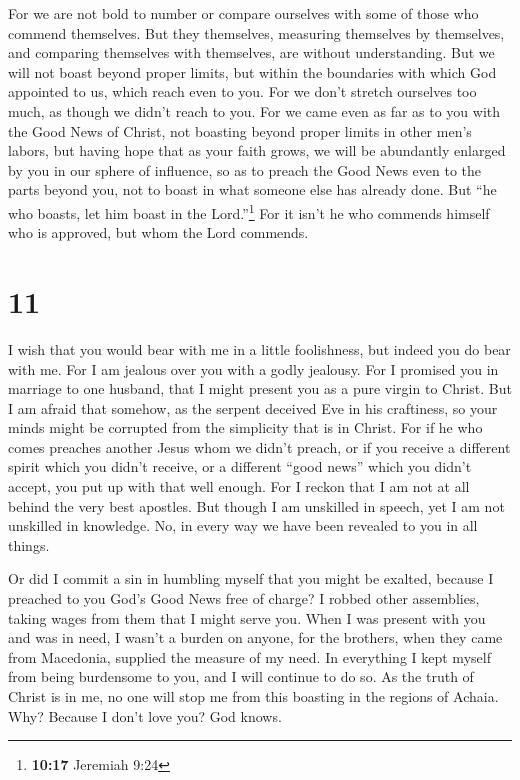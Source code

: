  For we are not bold to number or compare ourselves with
some of those who commend themselves. But they themselves, measuring
themselves by themselves, and comparing themselves with themselves, are
without understanding.  But we will not boast beyond
proper limits, but within the boundaries with which God appointed to us,
which reach even to you.  For we don't stretch ourselves
too much, as though we didn't reach to you. For we came even as far as
to you with the Good News of Christ,  not boasting beyond
proper limits in other men's labors, but having hope that as your faith
grows, we will be abundantly enlarged by you in our sphere of influence,
 so as to preach the Good News even to the parts beyond
you, not to boast in what someone else has already done. 
But ``he who boasts, let him boast in the Lord.''\footnote{\textbf{10:17}
  Jeremiah 9:24}  For it isn't he who commends himself
who is approved, but whom the Lord commends.

\hypertarget{section-10}{%
\section{11}\label{section-10}}

 I wish that you would bear with me in a little
foolishness, but indeed you do bear with me.  For I am
jealous over you with a godly jealousy. For I promised you in marriage
to one husband, that I might present you as a pure virgin to Christ.
 But I am afraid that somehow, as the serpent deceived Eve
in his craftiness, so your minds might be corrupted from the simplicity
that is in Christ.  For if he who comes preaches another
Jesus whom we didn't preach, or if you receive a different spirit which
you didn't receive, or a different ``good news'' which you didn't
accept, you put up with that well enough.  For I reckon
that I am not at all behind the very best apostles.  But
though I am unskilled in speech, yet I am not unskilled in knowledge.
No, in every way we have been revealed to you in all things.

 Or did I commit a sin in humbling myself that you might
be exalted, because I preached to you God's Good News free of charge?
 I robbed other assemblies, taking wages from them that I
might serve you.  When I was present with you and was in
need, I wasn't a burden on anyone, for the brothers, when they came from
Macedonia, supplied the measure of my need. In everything I kept myself
from being burdensome to you, and I will continue to do so.
 As the truth of Christ is in me, no one will stop me
from this boasting in the regions of Achaia.  Why?
Because I don't love you? God knows.


